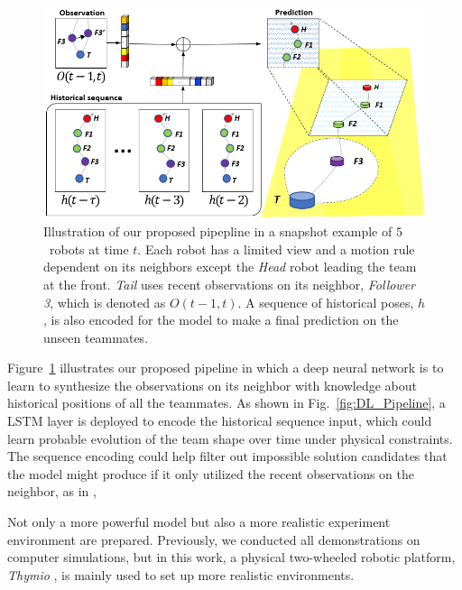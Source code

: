 \documentclass[letterpaper, 10 pt, conference]{ieeeconf}  %
\begin{document}
	\begin{figure}\centering
		\includegraphics[width=1.\columnwidth]{fig_Concept}
		\caption{Illustration of our proposed pipepline in a snapshot example of 
			$5$~robots at time $t$.
			Each robot has a limited view and a motion rule dependent on its neighbors
			except the \emph{Head} robot leading the team at the front. 
			\emph{Tail} uses recent observations on its neighbor, \emph{Follower 3}, 
			which is denoted as $O(t-1,t)$. A sequence of historical poses, $h$, is 
			also encoded for the model to make a final prediction on the 
			unseen teammates. 
		}
		\label{fig:Concept}
	\end{figure}
	
	Figure~\ref{fig:Concept} illustrates our proposed pipeline in which 
	a deep neural network is to learn to synthesize the observations on its neighbor 
	with knowledge about historical positions of all the teammates. 
	As shown in Fig.~\ref{fig:DL_Pipeline}, a LSTM layer is deployed to encode 
	the historical sequence input, which could learn probable evolution of the 
	team shape over time under physical constraints. 
	The sequence encoding could help filter out impossible solution candidates
	that the model might produce if it only utilized the recent observations on 
	the neighbor, as in \cite{CPR17}, 

	Not only a more powerful model but also a more realistic experiment 
	environment are prepared. Previously, we 
	conducted all demonstrations on computer simulations, but in this work, 
	a physical two-wheeled robotic platform, \emph{Thymio} \cite{Shin14}, is mainly 
	used to set up more realistic environments.
	
		
\end{document}
